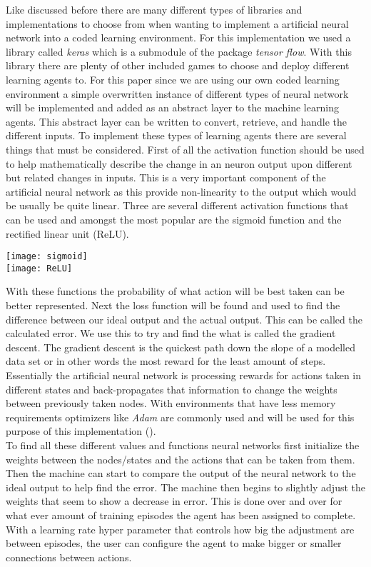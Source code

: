 \documentclass[letterpaper]{article}
\begin{document}
Like discussed before there are many different types of libraries and implementations to choose from when wanting to implement a artificial neural network into a coded learning environment.  For this implementation we used a library called \textit{keras} which is a submodule of the package \textit{tensor flow}.  With this library there are plenty of other included games to choose and deploy different learning agents to.  For this paper since we are using our own coded learning environment a simple overwritten instance of different types of neural network will be implemented and added as an abstract layer to the machine learning agents.  This abstract layer can be written to convert, retrieve, and handle the different inputs. 
\indent To implement these types of learning agents there are several things that must be considered.  First of all the activation function should be used to help mathematically describe the change in an neuron output upon different but related changes in inputs.  This is a very important component of the artificial neural network as this provide non-linearity to the output which would be usually be quite linear.  Three are several different activation functions that can be used and amongst the most popular are the sigmoid function and the rectified linear unit (ReLU).\\
\begin{center}
\texttt{[image: sigmoid]}\\
\texttt{[image: ReLU]}\\
\end{center}
With these functions the probability of what action will be best taken can be better represented.  Next the loss function will be found and used to find the difference between our ideal output and the actual output.  This can be called the calculated error. We use this to try and find the what is called the gradient descent.  The gradient descent is the quickest path down the slope of a modelled data set or in other words the most reward for the least amount of steps.  Essentially the artificial neural network is processing rewards for actions taken in different states and back-propagates that information to change the weights between previously taken nodes. With environments that have less memory requirements optimizers like \textit{Adam} are commonly used and will be used for this purpose of this implementation (\cite{chandrakant_2020}).\\
\indent  To find all these different values and functions neural networks first initialize the weights between the nodes/states and the actions that can be taken from them.  Then the machine can start to compare the output of the neural network to the ideal output to help find the error.  The machine then begins to slightly adjust the weights that seem to show a decrease in error.  This is done over and over for what ever amount of training episodes the agent has been assigned to complete.  With a learning rate hyper  parameter that controls how big the adjustment are between episodes, the user can configure the agent to make bigger or smaller connections between actions.  
\end{document}
